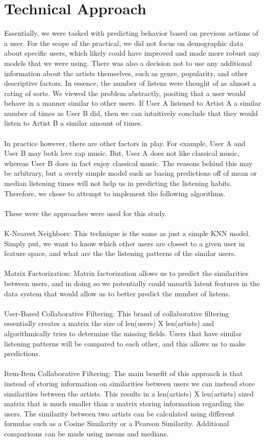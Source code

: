 \documentclass{article}
\begin{document}
\section{Technical Approach}
Essentially, we were tasked with predicting behavior based on previous actions of a user. For the scope of the practical, we did not focus on demographic data about specific users, which likely could have improved and made more robust any models that we were using. There was also a decision not to use any additional information about the artists themselves, such as genre, popularity, and other descriptive factors. In essence, the number of listens were thought of as almost a rating of sorts. We viewed the problem abstractly, positing that a user would behave in a manner similar to other users. If User A listened to Artist A a similar number of times as User B did, then we can intuitively conclude that they would listen to Artist B a similar amount of times.\\\\
In practice however, there are other factors in play. For example, User A and User B may both love rap music. But, User A does not like classical music, whereas User B does in fact enjoy classical music. The reasons behind this may be arbitrary, but a overly simple model such as basing predictions off of mean or median listening times will not help us in predicting the listening habits. Therefore, we chose to attempt to implement the following algorithms.\\\\
These were the approaches were used for this study.\\\\
K-Nearest Neighbors: This technique is the same as just a simple KNN model. Simply put, we want to know which other users are closest to a given user in feature space, and what are the the listening patterns of the similar users.\\\\
Matrix Factorization: Matrix factorization allows us to predict the similarities between users, and in doing so we potentially could unearth latent features in the data system that would allow us to better predict the number of listens.\\\\
User-Based Collaborative Filtering: This brand of collaborative filtering essentially creates a matrix the size of len(users) X len(artists) and algorithmically tries to determine the missing fields. Users that have similar listening patterns will be compared to each other, and this allows us to make predictions.\\\\
Item-Item Collaborative Filtering: The main benefit of this approach is that instead of storing information on similarities between users we can instead store similarities between the artists. This results in a len(artists) X len(artists) sized matrix that is much smaller than a matrix storing information regarding the users. The similarity between two artists can be calculated using different formulas such as a Cosine Similarity or a Pearson Similarity. Additional comparisons can be made using means and medians.\\\\
\end{document}
